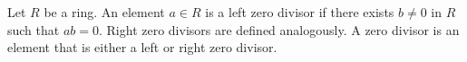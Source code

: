 Let $R$ be a ring. An element $a \in R$ is a left zero divisor if there exists $b \neq 0$ in $R$ such that $ab = 0$. Right zero divisors are defined analogously. A zero divisor is an element that is either a left or right zero divisor.
